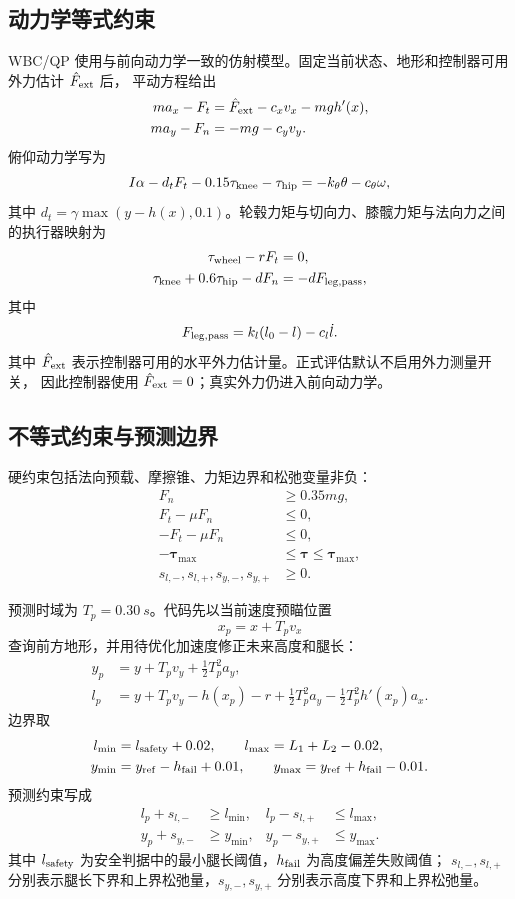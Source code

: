 \documentclass[UTF8,12pt,a4paper,fontset=none]{ctexart}
\begin{document}
\subsection{动力学等式约束}
WBC/QP 使用与前向动力学一致的仿射模型。固定当前状态、地形和控制器可用外力估计 $\hat F_{\rm ext}$ 后，
平动方程给出
\begin{align}
ma_x-F_t&=\hat F_{\rm ext}-c_xv_x-mgh'(x),\\
ma_y-F_n&=-mg-c_yv_y.
\end{align}
俯仰动力学写为
\begin{equation}
I\alpha-d_tF_t-0.15\tau_{\rm knee}-\tau_{\rm hip}
=-k_\theta\theta-c_\theta\omega,
\end{equation}
其中 $d_t=\gamma\max(y-h(x),0.1)$。轮毂力矩与切向力、膝髋力矩与法向力之间的执行器映射为
\begin{align}
\tau_{\rm wheel}-rF_t&=0,\\
\tau_{\rm knee}+0.6\tau_{\rm hip}-dF_n&=-dF_{\rm leg,pass},
\end{align}
其中
\begin{equation}
F_{\rm leg,pass}=k_l(l_0-l)-c_l\dot l.
\end{equation}
其中 $\hat F_{\rm ext}$ 表示控制器可用的水平外力估计量。正式评估默认不启用外力测量开关，
因此控制器使用 $\hat F_{\rm ext}=0$；真实外力仍进入前向动力学。

\subsection{不等式约束与预测边界}
硬约束包括法向预载、摩擦锥、力矩边界和松弛变量非负：
\begin{align}
F_n&\ge0.35mg,\\
F_t-\mu F_n&\le0,\\
-F_t-\mu F_n&\le0,\\
-\bm\tau_{\max}&\le\bm\tau\le\bm\tau_{\max},\\
s_{l,-},s_{l,+},s_{y,-},s_{y,+}&\ge0.
\end{align}

预测时域为 $T_p=\SI{0.30}{s}$。代码先以当前速度预瞄位置
\begin{equation}
x_p=x+T_pv_x
\end{equation}
查询前方地形，并用待优化加速度修正未来高度和腿长：
\begin{align}
y_p&=y+T_pv_y+\frac12T_p^2a_y,\\
l_p&=y+T_pv_y-h(x_p)-r
+\frac12T_p^2a_y-\frac12T_p^2h'(x_p)a_x.
\end{align}
边界取
\begin{align}
l_{\min}&=l_{\rm safety}+0.02,\qquad
l_{\max}=L_1+L_2-0.02,\\
y_{\min}&=y_{\rm ref}-h_{\rm fail}+0.01,\qquad
y_{\max}=y_{\rm ref}+h_{\rm fail}-0.01.
\end{align}
预测约束写成
\begin{align}
l_p+s_{l,-}&\ge l_{\min},&
l_p-s_{l,+}&\le l_{\max},\\
y_p+s_{y,-}&\ge y_{\min},&
y_p-s_{y,+}&\le y_{\max}.
\end{align}
其中 $l_{\rm safety}$ 为安全判据中的最小腿长阈值，$h_{\rm fail}$ 为高度偏差失败阈值；
$s_{l,-},s_{l,+}$ 分别表示腿长下界和上界松弛量，$s_{y,-},s_{y,+}$ 分别表示高度下界和上界松弛量。
\end{document}
